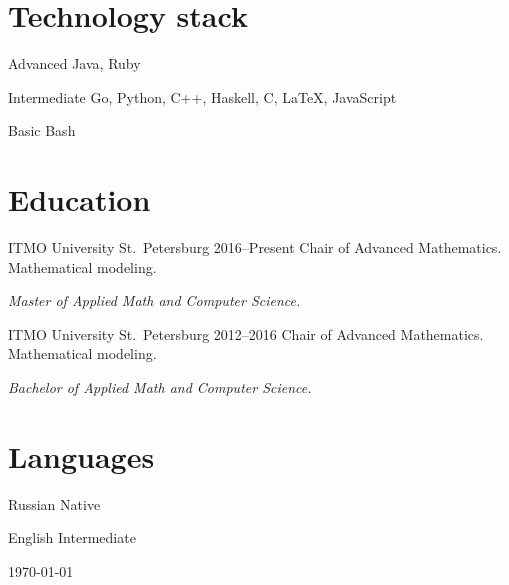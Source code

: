 \documentclass{cv}
\begin{document}
\section{Technology stack}

\begin{cvblock}{Advanced}
  Java, Ruby
\end{cvblock}

\begin{cvblock}{Intermediate}
  Go, Python, C++, Haskell, C, \LaTeX, JavaScript
\end{cvblock}

\begin{cvblock}{Basic}
  Bash
\end{cvblock}

\section{Education}

\begin{cvblock}{%
  \blocktitle
    {ITMO University}
    {St.~Petersburg}
    {}
    {2016--Present}}
  Chair of Advanced Mathematics. Mathematical modeling.
  \vspace{1em}

  \textit{Master of Applied Math and Computer Science.}
\end{cvblock}

\begin{cvblock}{%
  \blocktitle
    {ITMO University}
    {St.~Petersburg}
    {}
    {2012--2016}}
  Chair of Advanced Mathematics. Mathematical modeling.
  \vspace{1em}

  \textit{Bachelor of Applied Math and Computer Science.}
\end{cvblock}

\section{Languages}

\begin{cvblock}{Russian}
  Native
\end{cvblock}

\begin{cvblock}{English}
  Intermediate
\end{cvblock}

\vfill
\begin{center}
  \monthyear\today
\end{center}
\end{document}

